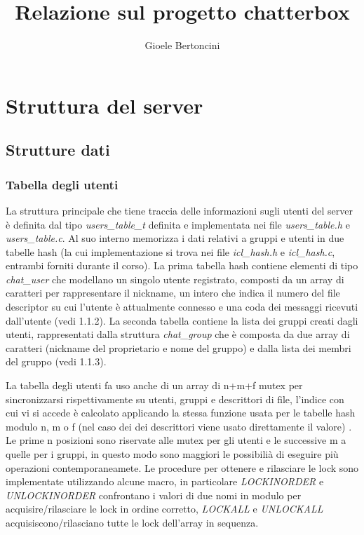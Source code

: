 \documentclass[11pt]{article}
\title{\textbf{Relazione sul progetto chatterbox}}
\author{Gioele Bertoncini}
\date{}
\begin{document}
\maketitle

\section{Struttura del server}
\subsection{Strutture dati}

\subsubsection{Tabella degli utenti}
La struttura principale che tiene traccia delle informazioni sugli utenti del server \`e definita dal tipo \emph{users\_table\_t} definita e implementata nei file \emph{users\_table.h} e \emph{users\_table.c}. Al suo interno memorizza i dati relativi a gruppi e utenti in due tabelle hash (la cui implementazione si trova nei file \emph{icl\_hash.h} e \emph{icl\_hash.c}, entrambi forniti durante il corso). La prima tabella hash contiene elementi di tipo \emph{chat\_user} che modellano un singolo utente registrato, composti da un array di caratteri per rappresentare il nickname, un intero che indica il numero del file descriptor su cui l'utente è attualmente connesso e una coda dei messaggi ricevuti dall'utente (vedi 1.1.2). La seconda tabella contiene la lista dei gruppi creati dagli utenti, rappresentati dalla struttura \emph{chat\_group} che \`e composta da due array di caratteri (nickname del proprietario e nome del gruppo) e dalla lista dei membri del gruppo (vedi 1.1.3).

La tabella degli utenti fa uso anche di un array di n+m+f mutex per sincronizzarsi rispettivamente su utenti, gruppi e descrittori di file, l'indice con cui vi si accede \`e calcolato applicando la stessa funzione usata per le tabelle hash modulo n, m o f (nel caso dei dei descrittori viene usato direttamente il valore) . Le prime n posizioni sono riservate alle mutex per gli utenti e le successive m a quelle per i gruppi, in questo modo sono maggiori le possibilià di eseguire più operazioni contemporaneamete. Le procedure per ottenere e rilasciare le lock sono implementate utilizzando alcune macro, in particolare \emph{LOCKINORDER} e \emph{UNLOCKINORDER} confrontano i valori di due nomi in modulo per acquisire/rilasciare le lock in ordine corretto, \emph{LOCKALL} e \emph{UNLOCKALL} acquisiscono/rilasciano tutte le lock dell'array in sequenza.
\end{document}
